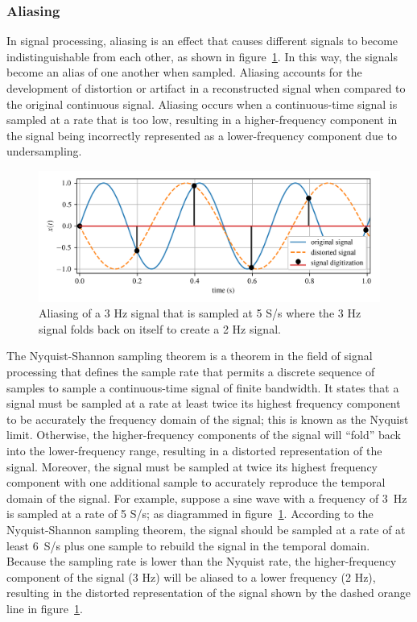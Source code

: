 \documentclass[12pt,letter]{article}
\begin{document}
	
\subsubsection{Aliasing}





In signal processing, aliasing is an effect that causes different signals to become indistinguishable from each other, as shown in figure~\ref{fig:aliasing}.  In this way, the signals become an alias of one another when sampled. Aliasing accounts for the development of distortion or artifact in a reconstructed signal when compared to the original continuous signal. Aliasing occurs when a continuous-time signal is sampled at a rate that is too low, resulting in a higher-frequency component in the signal being incorrectly represented as a lower-frequency component due to undersampling.

\begin{figure}[H]
    \centering
    \includegraphics[width=6.5in]{../figures/aliasing.png}
    \caption{Aliasing of a 3 Hz signal that is sampled at 5 S/s where the 3 Hz signal folds back on itself to create a 2 Hz signal.}
    \label{fig:aliasing}
\end{figure}

The Nyquist-Shannon sampling theorem is a theorem in the field of signal processing that defines the sample rate that permits a discrete sequence of samples to sample a continuous-time signal of finite bandwidth. It states that a signal must be sampled at a rate at least twice its highest frequency component to be accurately the frequency domain of the signal; this is known as the Nyquist limit. Otherwise, the higher-frequency components of the signal will ``fold'' back into the lower-frequency range, resulting in a distorted representation of the signal. Moreover, the signal must be sampled at twice its highest frequency component with one additional sample to accurately reproduce the temporal domain of the signal. For example, suppose a sine wave with a frequency of 3~Hz is sampled at a rate of 5 S/s; as diagrammed in figure~\ref{fig:aliasing}. According to the Nyquist-Shannon sampling theorem, the signal should be sampled at a rate of at least 6~S/s plus one sample to rebuild the signal in the temporal domain. Because the sampling rate is lower than the Nyquist rate, the higher-frequency component of the signal (3 Hz) will be aliased to a lower frequency (2 Hz), resulting in the distorted representation of the signal shown by the dashed orange line in figure~\ref{fig:aliasing}.
\end{document}
